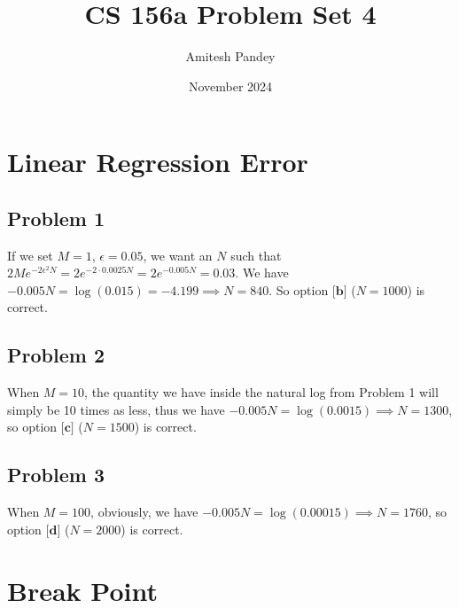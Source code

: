 \documentclass{article}
\title{CS 156a Problem Set 4}
\author{Amitesh Pandey}
\date{November 2024}
\begin{document}
\maketitle
\section*{Linear Regression Error}
\subsection*{Problem 1}
If we set $M = 1$, $\epsilon = 0.05$, we want an $N$ such that $2Me^{-2\epsilon^2 N} = 2e^{-2\cdot 0.0025N} = 2e^{-0.005N} = 0.03$. We have $-0.005N = \log{(0.015)} = -4.199 \implies N = 840$. So option $\textbf{[b]}$ ($N = 1000$) is correct.
\subsection*{Problem 2}
When $M = 10$, the quantity we have inside the natural log from Problem 1 will simply be 10 times as less, thus we have $-0.005N = \log{(0.0015)} \implies N  =1300$, so option $\textbf{[c]}$ ($N = 1500$) is correct.
\subsection*{Problem 3}
When $M = 100$, obviously, we have $-0.005N = \log{(0.00015)} \implies N = 1760$, so option $\textbf{[d]} $ ($N = 2000$) is correct.
\newpage
\section*{Break Point}
\end{document}
